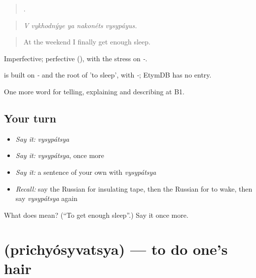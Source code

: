 \begin{quote}
    .
\end{quote}

\begin{quote}
\emph{V vykhodnýye ya nakonéts vysypáyus.}
\end{quote}

\begin{quote}
At the weekend I finally get enough sleep.
\end{quote}

Imperfective; perfective  (), with the stress on \emph{-}.

\begin{cousinweb}
\emph{} is built on \emph{-} and the root of \emph{} 'to sleep', with \emph{-}; EtymDB has no entry.
\end{cousinweb}

\begin{grammarlens}[title={What you've built}]
One more word for telling, explaining and describing at B1.
\end{grammarlens}

\subsection*{Your turn}
\begin{itemize}
\raggedright
  \item \emph{Say it:} \emph{vysypátsya}
  \item \emph{Say it:} \emph{vysypátsya}, once more
  \item \emph{Say it:} a sentence of your own with \emph{vysypátsya}
  \item \emph{Recall:} say the Russian for insulating tape, then the Russian for to wake, then say \emph{vysypátsya} again
\end{itemize}

\begin{tcolorbox}[breakable,colback=teal!4,colframe=teal!35!black,title={Before you move on}]
What does  mean? (\textquotedblleft{}To get enough sleep\textquotedblright{}.) Say it once more.
\end{tcolorbox}
\section[\texorpdfstring{\ru{причёсываться} (prichyósyvatsya)}{причёсываться (prichyósyvatsya)}]{ (prichyósyvatsya) — to do one's hair}

